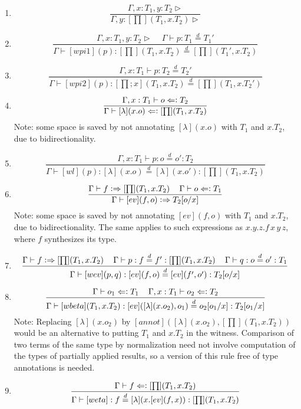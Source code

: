 \documentclass[11pt]{article}
\newcommand{\eqd}{\stackrel{d}{=}}
\newcommand{\spc}{{\,\,\,\,\,\,\,}}
\newcommand{\synth}{\vcentcolon\Rightarrow}
\newcommand{\force}{\Leftarrow\vcentcolon}
\begin{document}
\begin{enumerate}
\item 
$$\frac{\Gamma, x:T_1, y:T_2\rhd}{\Gamma, y:[\prod](T_1,x.T_2)\rhd}$$
\item 
$$\frac{\Gamma, x:T_1,y: T_2\rhd\spc \Gamma\vdash p:T_1\eqd T_1'}{\Gamma\vdash [wpi1](p):[\prod](T_1,x.T_2)\eqd [\prod](T_1',x.T_2)}$$

\item 
$$\frac{\Gamma, x:T_1\vdash p:T_2\eqd T_2'}{\Gamma\vdash [wpi2](p):[\prod;x](T_1,x.T_2)\eqd [\prod](T_1,x.T_2')}$$

\item 
$$\frac{\Gamma, x : T_1\vdash o \force T_2}{\Gamma\vdash [\lambda](x.o) \force [\prod](T_1,x.T_2)}$$
Note: some space is saved by not annotating $[\lambda](x.o)$ with $T_1$ and $x.T_2$, due to bidirectionality.

\item 
$$\frac{\Gamma, x:T_1\vdash p : o\eqd o' : T_2}{\Gamma\vdash [wl](p) : [\lambda](x.o)\eqd [\lambda](x.o') : [\prod](T_1,x.T_2)}$$
\item 
$$\frac{\Gamma\vdash f \synth [\prod](T_1,x.T_2)\spc \Gamma\vdash o \force T_1}{\Gamma\vdash [ev](f,o) \synth T_2[o/x]}$$
Note: some space is saved by not annotating $[ev](f,o)$ with $T_1$ and $x.T_2$, due to bidirectionality.  The same applies to such expressions
as $x.y.z.f\, x\, y\, z$, where $f$ synthesizes its type.
\item 
$$\frac{\Gamma\vdash f \synth [\prod](T_1,x.T_2) \spc \Gamma\vdash p : f \eqd f' : [\prod](T_1,x.T_2)\spc \Gamma\vdash q : o \eqd o' : T_1}{\Gamma\vdash [wev](p,q) : [ev](f,o) \eqd [ev](f',o') : T_2[o/x]}$$
\item 
$$\frac{ \Gamma\vdash o_1 \force T_1\spc \Gamma, x:T_1\vdash o_2 \force T_2}{\Gamma\vdash [wbeta](T_1,x.T_2) : [ev]([\lambda](x.o_2),o_1) \eqd o_2[o_1/x] : T_2[o_1/x]}$$
Note: Replacing $[\lambda](x.o_2)$ by $[annot]([\lambda](x.o_2),[\prod](T_1,x.T_2))$ would be an alternative to putting $T_1$ and $x.T_2$ in the witness.
Comparison of two terms of the same type by normalization need not involve
computation of the types of partially applied results, so a version of this
rule free of type annotations is needed.
\item 
$$\frac{\Gamma\vdash f \force [\prod](T_1,x.T_2)}{\Gamma\vdash [weta] : f \eqd [\lambda](x.[ev](f,x)) : [\prod](T_1,x.T_2)}$$ 

\end{enumerate}



\end{document}

